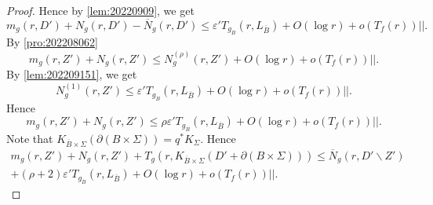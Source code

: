 \documentclass[11pt,english]{smfart}
\theoremstyle{plain}
\theoremstyle{definition}
\theoremstyle{remark}
\numberwithin{equation}{section}
\theoremstyle{plain}
\begin{document}
\begin{proof}
		
		Hence by \cref{lem:20220909}, we get 
		\begin{equation*}
			m_{g}(r,D')+N_{g}(r,D')-\overline{N}_{g}(r,D')\leq\varepsilon' T_{g_B}(r,L_{\overline{B}})
			+O(\log r)+o(T_f(r))||.
		\end{equation*}
		By \cref{pro:202208062} 
		\begin{equation*}
			m_{g}(r,Z')+N_{g}(r,Z')\leq N^{(\rho)}_{g}(r,Z')+
			O(\log r)+o(T_f(r))||.
		\end{equation*}
		By \cref{lem:202209151}, we get
		$$
		N^{(1)}_{g}(r,Z')\leq \varepsilon' T_{g_B}(r,L_{\overline{B}})
		+O(\log r)+o(T_f(r))||.
		$$
		Hence
		$$
		m_{g}(r,Z')+N_{g}(r,Z')\leq \rho\varepsilon'T_{g_B}(r,L_{\overline{B}})
		+O(\log r)+o(T_f(r))||.
		$$  
		Note that $K_{\overline{B}\times \Sigma}(\partial (B\times \Sigma))=q^*K_{\Sigma}$.
		Hence
		\begin{multline}\label{eqn:202211301}
			m_{g}(r,Z')+N_{g}(r,Z')+T_{g}(r,K_{\overline{B}\times \Sigma}(D'+\partial (B\times \Sigma)))\leq \overline{N}_{g}(r,D'\backslash Z')
			\\
			+(\rho+2)\varepsilon' T_{g_B}(r,L_{\overline{B}})
			+O(\log r)+o(T_f(r))||.
		\end{multline}
		

\end{proof}
\end{document}
